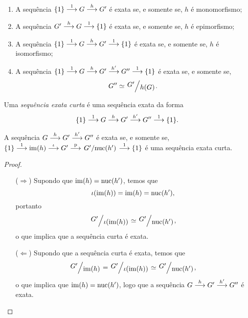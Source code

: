 \begin{exercise}
	\begin{enumerate}
	\item A sequência ${\{1\}} \overset{1}{\longrightarrow} {G} \overset{h}{\longrightarrow} G'$ é exata se, e somente se, $h$ é monomorfismo;
	\item A sequência ${G'} \overset{h}{\longrightarrow} {G} \overset{1}{\longrightarrow} \{1\}$ é exata se, e somente se, $h$ é epimorfismo;
	\item A sequência ${\{1\}} \overset{1}{\longrightarrow} {G} \overset{h}{\longrightarrow} {G'} \overset{1}{\longrightarrow} \{1\}$ é exata se, e somente se, $h$ é isomorfismo;
	\item A sequência ${\{1\}} \overset{1}{\longrightarrow} {G} \overset{h}{\longrightarrow} {G'} \overset{h'}{\longrightarrow} {G''} \overset{1}{\longrightarrow} \{1\}$ é exata se, e somente se,
		\begin{equation*}
		G'' \simeq \quo{G'}{h(G)}.
		\end{equation*}
	\end{enumerate}
\end{exercise}

\begin{definition}
Uma \emph{sequência exata curta} é uma sequência exata da forma
	\begin{equation*}
	{\{1\}} \overset{1}{\longrightarrow} {G} \overset{h}{\longrightarrow} {G'} \overset{h'}{\longrightarrow} {G''} \overset{1}{\longrightarrow} \{1\}.
	\end{equation*}
\end{definition}

\begin{proposition}
A sequência ${G} \overset{h}{\longrightarrow} {G'} \overset{h'}{\longrightarrow} G''$ é exata se, e somente se, $\funseq{\{1\}}{1} \funseq{\im(h)}{\inclu} \funseq{G'}{\proj} \funseq{\quo{G'}{\nuc(h')}}{1} \{1\}$ é uma sequência exata curta.
\end{proposition}
\begin{proof}
	\begin{itemize}
	\item [($\Rightarrow$)] Supondo que $\operatorname{im}(h) = \operatorname{nuc}(h')$, temos que
		\begin{equation*}
		\iota(\operatorname{im}(h)) = \operatorname{im}(h) = \operatorname{nuc}(h'),
		\end{equation*}
	portanto
		\begin{equation*}
		\quo{G'}{\inclu(\im(h))} \simeq \quo{G'}{\nuc(h')},
		\end{equation*}
	o que implica que a sequência curta é exata.

	\item [($\Leftarrow$)] Supondo que a sequência curta é exata, temos que
		\begin{equation*}
		\quo{G'}{\im(h)} = \quo{G'}{\inclu(\im(h))} \simeq \quo{G'}{\nuc(h')},
		\end{equation*}
	o que implica que $\operatorname{im}(h) = \operatorname{nuc}(h')$, logo que a sequência ${G} \overset{h}{\longrightarrow} {G'} \overset{h'}{\longrightarrow} G''$ é exata.
	\qedhere
	\end{itemize}
\end{proof}
